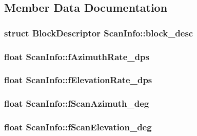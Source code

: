 \subsection{Member Data Documentation}
\hypertarget{structScanInfo_aa35e33646202e65820e4e5877bb4638a}{
\subsubsection[{block\-\_\-desc}]{\setlength{\rightskip}{0pt plus 5cm}struct {\bf Block\-Descriptor} Scan\-Info\-::block\-\_\-desc}}\label{structScanInfo_aa35e33646202e65820e4e5877bb4638a}
\hypertarget{structScanInfo_abe3ee38419275b220a4f25bcfc86eac6}{
\subsubsection[{f\-Azimuth\-Rate\-\_\-dps}]{\setlength{\rightskip}{0pt plus 5cm}float Scan\-Info\-::f\-Azimuth\-Rate\-\_\-dps}}\label{structScanInfo_abe3ee38419275b220a4f25bcfc86eac6}
\hypertarget{structScanInfo_aaa3e0950a443caa4c6d7ad54657edb5e}{
\subsubsection[{f\-Elevation\-Rate\-\_\-dps}]{\setlength{\rightskip}{0pt plus 5cm}float Scan\-Info\-::f\-Elevation\-Rate\-\_\-dps}}\label{structScanInfo_aaa3e0950a443caa4c6d7ad54657edb5e}
\hypertarget{structScanInfo_a98d65e9d50d3fc3c382c8c30107829df}{
\subsubsection[{f\-Scan\-Azimuth\-\_\-deg}]{\setlength{\rightskip}{0pt plus 5cm}float Scan\-Info\-::f\-Scan\-Azimuth\-\_\-deg}}\label{structScanInfo_a98d65e9d50d3fc3c382c8c30107829df}
\hypertarget{structScanInfo_af32649e9efdecf231eda758aac971ec3}{
\subsubsection[{f\-Scan\-Elevation\-\_\-deg}]{\setlength{\rightskip}{0pt plus 5cm}float Scan\-Info\-::f\-Scan\-Elevation\-\_\-deg}}\label{structScanInfo_af32649e9efdecf231eda758aac971ec3}
